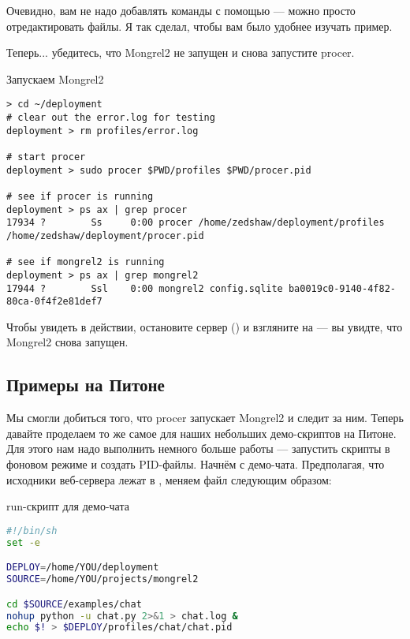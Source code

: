Очевидно, вам не надо добавлять команды с помощью  --- можно просто
отредактировать файлы. Я так сделал, чтобы вам было удобнее изучать пример.

Теперь... убедитесь, что Mongrel2 не запущен и снова запустите procer.

\begin{code}{Запускаем Mongrel2}
\begin{lstlisting}
> cd ~/deployment
# clear out the error.log for testing
deployment > rm profiles/error.log

# start procer
deployment > sudo procer $PWD/profiles $PWD/procer.pid

# see if procer is running
deployment > ps ax | grep procer
17934 ?        Ss     0:00 procer /home/zedshaw/deployment/profiles /home/zedshaw/deployment/procer.pid

# see if mongrel2 is running
deployment > ps ax | grep mongrel2
17944 ?        Ssl    0:00 mongrel2 config.sqlite ba0019c0-9140-4f82-80ca-0f4f2e81def7

\end{lstlisting}
\end{code}

Чтобы увидеть  в действии, остановите сервер () и взгляните на 
--- вы увидте, что Mongrel2 снова запущен.

\subsection{Примеры на Питоне}

Мы смогли добиться того, что procer запускает Mongrel2 и следит за ним. Теперь
давайте проделаем то же самое для наших небольших демо-скриптов на Питоне. Для
этого нам надо выполнить немного больше работы --- запустить скрипты в фоновом
режиме и создать PID-файлы. Начнём с демо-чата. Предполагая, что исходники
веб-сервера лежат в , меняем файл
 следующим образом:

\begin{code}{run-скрипт для демо-чата}
\begin{lstlisting}[language=sh]
#!/bin/sh
set -e

DEPLOY=/home/YOU/deployment
SOURCE=/home/YOU/projects/mongrel2

cd $SOURCE/examples/chat
nohup python -u chat.py 2>&1 > chat.log &
echo $! > $DEPLOY/profiles/chat/chat.pid
\end{lstlisting}
\end{code}

